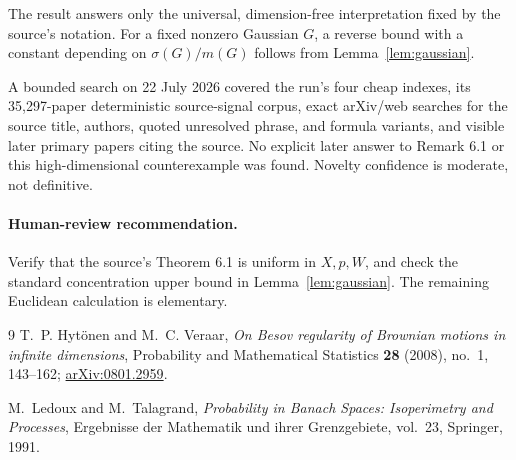 \documentclass[11pt]{article}
\begin{document}
The result answers only the universal, dimension-free interpretation fixed by
the source's notation. For a fixed nonzero Gaussian $G$, a reverse bound with
a constant depending on $\sigma(G)/m(G)$ follows from
Lemma~\ref{lem:gaussian}.

A bounded search on 22 July 2026 covered the run's four cheap indexes, its
35,297-paper deterministic source-signal corpus, exact arXiv/web searches for
the source title, authors, quoted unresolved phrase, and formula variants,
and visible later primary papers citing the source. No explicit later answer
to Remark 6.1 or this high-dimensional counterexample was found. Novelty
confidence is moderate, not definitive.

\paragraph{Human-review recommendation.}
Verify that the source's Theorem 6.1 is uniform in $X,p,W$, and check the
standard concentration upper bound in Lemma~\ref{lem:gaussian}. The remaining
Euclidean calculation is elementary.

\begin{thebibliography}{9}
T.~P. Hytönen and M.~C. Veraar,
\emph{On Besov regularity of Brownian motions in infinite dimensions},
Probability and Mathematical Statistics \textbf{28} (2008), no.~1, 143--162;
\href{https://arxiv.org/abs/0801.2959}{arXiv:0801.2959}.

M.~Ledoux and M.~Talagrand,
\emph{Probability in Banach Spaces: Isoperimetry and Processes},
Ergebnisse der Mathematik und ihrer Grenzgebiete, vol.~23,
Springer, 1991.
\end{thebibliography}
\end{document}

